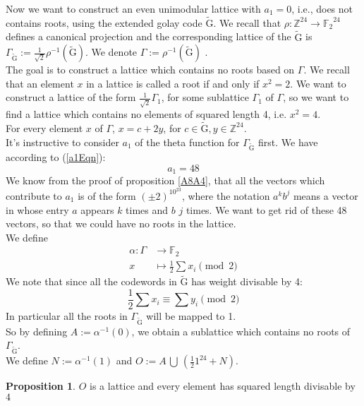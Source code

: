 \documentclass[12pt]{article}
\theoremstyle{definition}
\newtheorem{prop}[theorem]{Proposition}
\numberwithin{equation}{theorem}
\numberwithin{figure}{theorem}
\newcommand{\Ftwo}{\ensuremath{\mathbb{F}_2}}
\newcommand{\cCodes}{\ensuremath{\widetilde{\mathrm{G}}}}
\newcommand{\buildLattice}[1]{\ensuremath{\Gamma_{#1}}}
\newcommand{\Integer}{\ensuremath{\mathbb{Z}}}
\begin{document}
Now we want to construct an even unimodular lattice with $a_1 = 0$, i.e., does not contains roots, using the extended golay code {\cCodes}.
We recall that $\rho :\Integer^{24} \rightarrow \Ftwo^{24}$ defines a canonical projection and the corresponding lattice of the {\cCodes} is $\buildLattice{\cCodes} := \frac{1}{\sqrt{2}}\rho^{-1}(\cCodes)$. We denote $\Gamma := \rho^{-1}(\cCodes)$ .\\ The goal is to construct a lattice which contains no roots based on $\Gamma$. We recall that an element $x$ in a lattice is called a root if and only if $x^2 = 2$. We want to construct a lattice of the form $\frac{1}{\sqrt{2}}\Gamma_1$, for some sublattice $\Gamma_1$ of $\Gamma$, so we want to find a lattice which contains no elements of squared length 4, i.e. $x^2 = 4$. \\For every element $x$ of $\Gamma$, $x = c + 2y$, for $c \in \cCodes , y\in \Integer^{24}$. \\
It's instructive to consider $a_1$ of the theta function for $\buildLattice{\cCodes}$ first. We have according to (\ref{a1Eqn}):
\[
	a_1 = 48
\]
We know from the proof of proposition \ref{A8A4}, that all the vectors which contribute to $a_1$ is of the form $(\pm2)^10^{23}$, where the notation $a^kb^j$ means a vector in whose entry $a$ appears $k$ times and $b$ $j$ times. We want to get rid of these 48 vectors, so that we could have no roots in the lattice. \\
We define
\begin{align*}
	\alpha: \Gamma &\rightarrow \Ftwo \\
			x &\mapsto \frac{1}{2}\sum{x_i} \pmod 2
\end{align*}
We note that since all the codewords in $\cCodes$ has weight divisable by 4:
\[
\frac{1}{2} \sum{x_i} \equiv \sum{y_i} \pmod 2
\]
In particular all the roots in $\buildLattice{\cCodes}$ will be mapped to 1.\\
So by defining $A:= \alpha^{-1}(0)$, we obtain a sublattice which contains no roots of  $\buildLattice{\cCodes}$. \\
We define $N := \alpha^{-1}(1)$ and $O := A \, \bigcup \,(\frac{1}{2}1^{24} + N)$.
\begin{prop}\label{propLeechPreliminary}
$O$ is a lattice and every element has squared length divisable by $4$
\end{prop}
\end{document}
